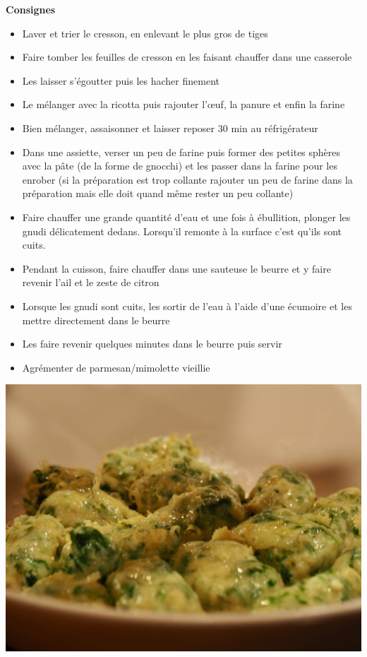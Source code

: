 \documentclass[]{book}
\providecommand{\tightlist}{%
  \setlength{\itemsep}{0pt}\setlength{\parskip}{0pt}}
\begin{document}
\textbf{Consignes}

\begin{itemize}
\tightlist
\item
  Laver et trier le cresson, en enlevant le plus gros de tiges
\item
  Faire tomber les feuilles de cresson en les faisant chauffer dans une
  casserole
\item
  Les laisser s'égoutter puis les hacher finement
\item
  Le mélanger avec la ricotta puis rajouter l'œuf, la panure et enfin la
  farine
\item
  Bien mélanger, assaisonner et laisser reposer 30 min au réfrigérateur
\item
  Dans une assiette, verser un peu de farine puis former des petites
  sphères avec la pâte (de la forme de gnocchi) et les passer dans la
  farine pour les enrober (si la préparation est trop collante rajouter
  un peu de farine dans la préparation mais elle doit quand même rester
  un peu collante)
\item
  Faire chauffer une grande quantité d'eau et une fois à ébullition,
  plonger les gnudi délicatement dedans. Lorsqu'il remonte à la surface
  c'est qu'ils sont cuits.
\item
  Pendant la cuisson, faire chauffer dans une sauteuse le beurre et y
  faire revenir l'ail et le zeste de citron
\item
  Lorsque les gnudi sont cuits, les sortir de l'eau à l'aide d'une
  écumoire et les mettre directement dans le beurre
\item
  Les faire revenir quelques minutes dans le beurre puis servir
\item
  Agrémenter de parmesan/mimolette vieillie
\end{itemize}

\begin{center}\includegraphics[width=0.9\linewidth]{photos/gnudi} \end{center}
\end{document}
